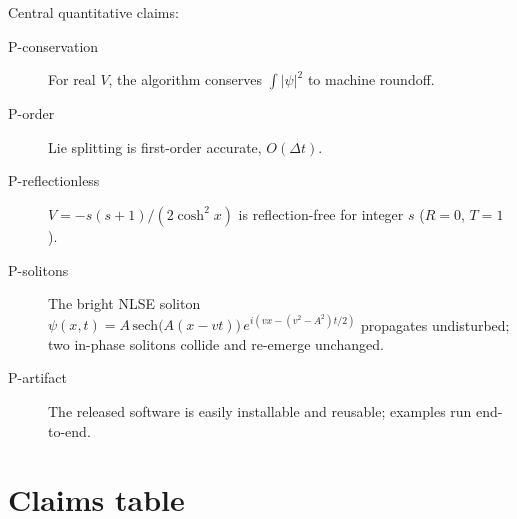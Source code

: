 \documentclass[11pt,a4paper]{article}
\begin{document}
Central quantitative claims:
\begin{description}
  \item[P-conservation] For real $V$, the algorithm conserves
    $\int|\psi|^{2}$ to machine roundoff.
  \item[P-order] Lie splitting is first-order accurate, $O(\Delta t)$.
  \item[P-reflectionless] $V = -s(s+1)/(2\cosh^{2}x)$ is reflection-free
    for integer $s$ ($R=0$, $T=1$).
  \item[P-solitons] The bright NLSE soliton
    $\psi(x,t)=A\,\mathrm{sech}\!\bigl(A(x-vt)\bigr)\,e^{i(vx - (v^{2}-A^{2})t/2)}$
    propagates undisturbed; two in-phase solitons collide and re-emerge
    unchanged.
  \item[P-artifact] The released software is easily installable and reusable;
    examples run end-to-end.
\end{description}

\section{Claims table}
\label{sec:claims}
\end{document}

